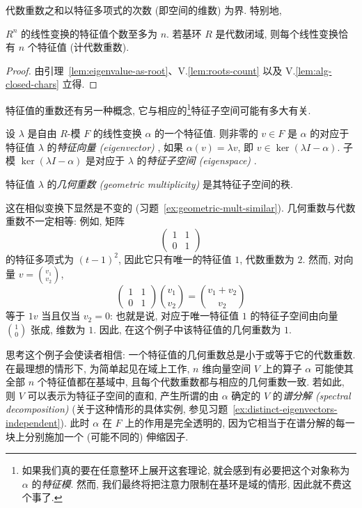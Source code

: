 代数重数之和以特征多项式的次数 (即空间的维数) 为界. 特别地,

\begin{corollary}\label{cor:eigenvalue-count}
$R^n$ 的线性变换的特征值个数至多为 $n$. 若基环 $R$ 是代数闭域, 则每个线性变换恰有 $n$ 个特征值 (计代数重数).
\end{corollary}

\begin{proof}
由引理~\ref{lem:eigenvalue-as-root}、V.\ref{lem:roots-count} 以及 V.\ref{lem:alg-closed-chars} 立得.
\end{proof}

特征值的重数还有另一种概念, 它与相应的\footnote{如果我们真的要在任意整环上展开这套理论, 就会感到有必要把这个对象称为 $\alpha$ 的\emph{特征模}. 然而, 我们最终将把注意力限制在基环是域的情形, 因此就不费这个事了.}特征子空间可能有多大有关.

\begin{definition}\label{def:eigenvector}
设 $\lambda$ 是自由 $R$-模 $F$ 的线性变换 $\alpha$ 的一个特征值. 则非零的 $v\in F$ 是 $\alpha$ 的对应于特征值 $\lambda$ 的\emph{特征向量 (eigenvector)}
, 如果 $\alpha(v)=\lambda v$, 即 $v\in\ker(\lambda I-\alpha)$. 子模 $\ker(\lambda I-\alpha)$ 是对应于 $\lambda$ 的\emph{特征子空间 (eigenspace)}
.
\end{definition}

\begin{definition}\label{def:geometric-multiplicity}
特征值 $\lambda$ 的\emph{几何重数 (geometric multiplicity)}
是其特征子空间的秩.
\end{definition}

这在相似变换下显然是不变的 (习题~\ref{ex:geometric-mult-similar}). 几何重数与代数重数不一定相等: 例如, 矩阵
\[
\begin{pmatrix}1&1\\0&1\end{pmatrix}
\]
的特征多项式为 $(t-1)^2$, 因此它只有唯一的特征值 $1$, 代数重数为 $2$. 然而, 对向量 $v=\binom{v_1}{v_2}$,
\[
\begin{pmatrix}1&1\\0&1\end{pmatrix}\binom{v_1}{v_2}=\binom{v_1+v_2}{v_2}
\]
等于 $1v$ 当且仅当 $v_2=0$: 也就是说, 对应于唯一特征值 $1$ 的特征子空间由向量 $\binom{1}{0}$ 张成, 维数为 $1$. 因此, 在这个例子中该特征值的几何重数为 $1$.

思考这个例子会使读者相信: 一个特征值的几何重数总是小于或等于它的代数重数. 在最理想的情形下, 为简单起见在域上工作, $n$ 维向量空间 $V$ 上的算子 $\alpha$ 可能使其全部 $n$ 个特征值都在基域中, 且每个代数重数都与相应的几何重数一致. 若如此, 则 $V$ 可以表示为特征子空间的直和, 产生所谓的由 $\alpha$ 确定的 $V$ 的\emph{谱分解 (spectral decomposition)}
(关于这种情形的具体实例, 参见习题~\ref{ex:distinct-eigenvectors-independent}). 此时 $\alpha$ 在 $F$ 上的作用是完全透明的, 因为它相当于在谱分解的每一块上分别施加一个 (可能不同的) 伸缩因子.

